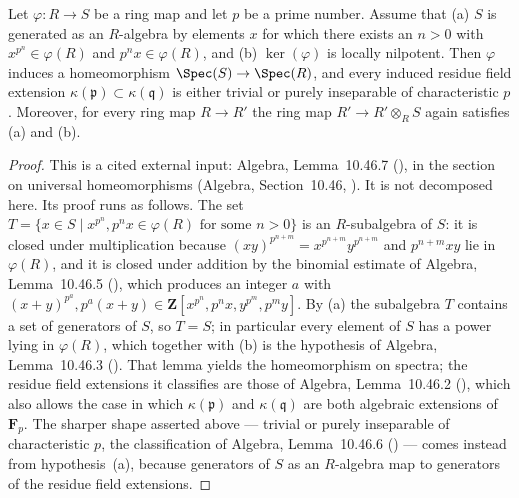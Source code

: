 \begin{lemma}
\label{lem:pc-homeo-criterion-p-power}
Let $\varphi:R\to S$ be a ring map and let $p$ be a prime number.  Assume
that (a) $S$ is generated as an $R$-algebra by elements $x$ for which there
exists an $n>0$ with $x^{p^n}\in\varphi(R)$ and $p^nx\in\varphi(R)$, and (b)
$\ker(\varphi)$ is locally nilpotent.  Then $\varphi$ induces a
homeomorphism $\Spec(S)\to\Spec(R)$, and every induced residue field
extension $\kappa(\mathfrak p)\subset\kappa(\mathfrak q)$ is either trivial
or purely inseparable of characteristic $p$.  Moreover, for every ring map
$R\to R'$ the ring map $R'\to R'\otimes_RS$ again satisfies (a) and (b).
\end{lemma}
\begin{proof}
This is a cited external input: Algebra, Lemma~10.46.7
(), in the section on universal homeomorphisms
(Algebra, Section~10.46, ).  It is not decomposed here.
Its proof runs as follows.  The set
$T=\{x\in S\mid x^{p^n},p^nx\in\varphi(R)\text{ for some }n>0\}$
is an $R$-subalgebra of $S$: it is closed under
multiplication because $(xy)^{p^{n+m}}=x^{p^{n+m}}y^{p^{n+m}}$ and
$p^{n+m}xy$ lie in $\varphi(R)$, and it is closed under addition by the
binomial estimate of Algebra, Lemma~10.46.5 (), which
produces an integer $a$ with
$(x+y)^{p^a},p^a(x+y)\in\mathbf Z[x^{p^n},p^nx,y^{p^m},p^my]$.  By (a) the
subalgebra $T$ contains a set of generators of $S$, so $T=S$; in particular
every element of $S$ has a power lying in $\varphi(R)$, which together with
(b) is the hypothesis of Algebra, Lemma~10.46.3 ().
That lemma yields the homeomorphism on spectra; the residue field
extensions it classifies are those of Algebra, Lemma~10.46.2
(), which also allows the case in which
$\kappa(\mathfrak p)$ and $\kappa(\mathfrak q)$ are both algebraic
extensions of $\mathbf F_p$.  The sharper shape asserted above --- trivial
or purely inseparable of characteristic $p$, the classification of
Algebra, Lemma~10.46.6 () --- comes instead from
hypothesis~(a), because generators of $S$ as an $R$-algebra map to
generators of the residue field extensions.
\end{proof}

